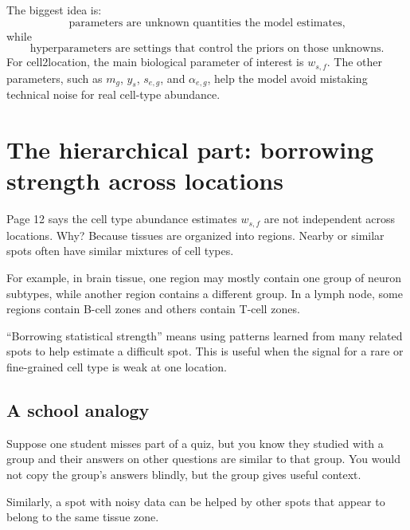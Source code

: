 \documentclass[11pt]{article}
\begin{document}
\begin{bigidea}
The biggest idea is:
\[
\text{parameters are unknown quantities the model estimates,}
\]
while
\[
\text{hyperparameters are settings that control the priors on those unknowns.}
\]
For cell2location, the main biological parameter of interest is $w_{s,f}$. The other parameters, such as $m_g$, $y_s$, $s_{e,g}$, and $\alpha_{e,g}$, help the model avoid mistaking technical noise for real cell-type abundance.
\end{bigidea}


\section{The hierarchical part: borrowing strength across locations}

Page 12 says the cell type abundance estimates $w_{s,f}$ are not independent across locations. Why? Because tissues are organized into regions. Nearby or similar spots often have similar mixtures of cell types.

For example, in brain tissue, one region may mostly contain one group of neuron subtypes, while another region contains a different group. In a lymph node, some regions contain B-cell zones and others contain T-cell zones.

\begin{bigidea}
``Borrowing statistical strength'' means using patterns learned from many related spots to help estimate a difficult spot. This is useful when the signal for a rare or fine-grained cell type is weak at one location.
\end{bigidea}

\subsection{A school analogy}

Suppose one student misses part of a quiz, but you know they studied with a group and their answers on other questions are similar to that group. You would not copy the group's answers blindly, but the group gives useful context.

Similarly, a spot with noisy data can be helped by other spots that appear to belong to the same tissue zone.
\end{document}
